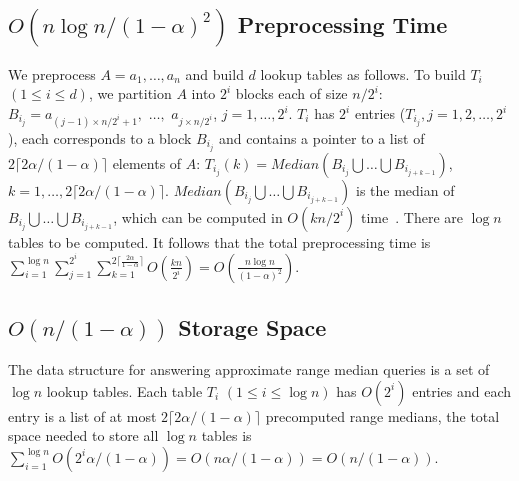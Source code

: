 \documentclass{llncs}
\begin{document}
\subsection{$O(n\log n/(1-\alpha)^2)$ Preprocessing Time}
We preprocess $A=a_1,\ldots,a_n$ and build $d$ lookup tables
as follows. To build $T_i$ $(1 \leq i \leq d)$, we partition $A$ 
into $2^i$ blocks each of size $n/2^i$:
$B_{i_j} = a_{(j-1) \times n/2^i + 1},$
\linebreak[3] $\ldots,$ \linebreak[3] $a_{j \times
  n/2^i}$, $j = 1, \ldots, 2^i$. $T_i$ has $2^i$ 
entries ($T_{i_j}, j = 1,2,\ldots,2^i$), each corresponds to a 
block $B_{i_j}$ and contains a pointer to a list of $2 \lceil
2 \alpha / (1-\alpha) \rceil$ elements of $A$:
$T_{i_j}(k) = Median(B_{i_j} \bigcup \ldots \bigcup B_{i_{j+k-1}} )$,
$k = 1, \ldots, 2 \lceil 2 \alpha / (1-\alpha) \rceil$.
$Median(B_{i_j} \bigcup \ldots \bigcup B_{i_{j+k-1}})$ is the 
median of $B_{i_j} \bigcup \ldots \bigcup B_{i_{j+k-1}}$,
which can be computed in $O(kn/2^i)$
time~\cite{bfprt73}. There are $\log n$ tables to be computed. It
follows that the total preprocessing time is $\sum_{i=1}^{\log
                                    n}\sum_{j=1}^{2^i}\sum_{k=1}^
                                  {2 \lceil \frac{2 \alpha}{1-\alpha}
                                    \rceil}
                                  O(\frac{kn}{2^i})
                                     =  O\left(\frac{n \log n}{(1-\alpha)^2}\right)$.



\subsection{$O(n/(1-\alpha))$ Storage Space}

The data structure for answering approximate range median 
queries is a set of $\log n$ lookup tables. Each table $T_i$ $(1 \leq i \leq \log n)$ 
has $O(2^i)$ entries and each entry is a list of at most $2\lceil
2\alpha / (1-\alpha)\rceil$ precomputed range medians, the 
total space needed to store all $\log n$ 
tables is $\sum_{i=1}^{\log n}{O(2^i \alpha/(1-\alpha))} =
O(n \alpha/(1-\alpha))=O(n/(1-\alpha))$. 
\end{document}

